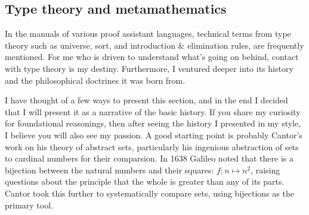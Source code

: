 \documentclass{article}
\begin{document}
\subsection{Type theory and metamathematics}
In the manuals of various proof assistant languages, technical terms from type
theory such as universe, sort, and introduction \& elimination rules, are
frequently mentioned. For me who is driven to understand what's going on
behind, contact with type theory is my destiny. Furthermore, I ventured deeper
into its history and the philosophical doctrines it was born from.

I have thought of a few ways to present this section, and in the end I decided
that I will present it as a narrative of the basic history. If you share my
curiosity for foundational reasonings, then after seeing the history I
presented in my style, I believe you will also see my passion.  A good starting
point is probably Cantor's work on his theory of abstract sets, particularly
his ingenious abstraction of sets to cardinal numbers for their comparsion.  In
1638 Galileo noted that there is a bijection between the natural numbers and
their squares: $f : n \mapsto n^2$, raising questions about the principle that
the whole is greater than any of its parts. Cantor took this further to
systematically compare sets, using bijections as the primary tool. 
\end{document}

